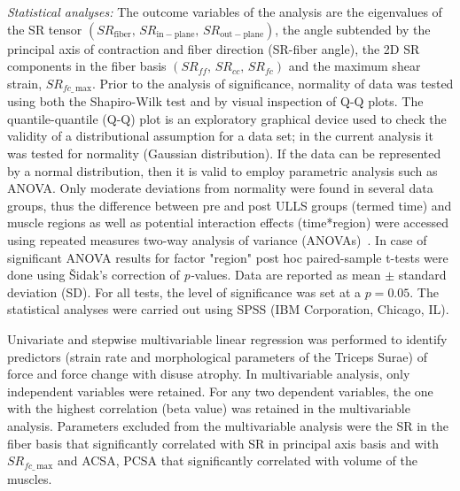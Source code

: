 \textit{Statistical analyses:}
The outcome variables of the analysis are the eigenvalues of the SR tensor $(SR_{\mathrm{fiber}},\, SR_{\mathrm{in-plane}},\, SR_{\mathrm{out-plane}})$, the angle subtended by the principal axis of contraction and fiber direction (SR-fiber angle), the 2D SR components in the fiber basis $(SR_{ff},\, SR_{cc},\, SR_{fc})$ and the maximum shear strain, $SR_{fc\_\,\mathrm{max}}$. 
Prior to the analysis of significance, normality of data was tested using both the Shapiro-Wilk test and by visual inspection of Q-Q plots.  
The quantile-quantile (Q-Q) plot is an exploratory graphical device used to check the validity of a distributional assumption for a data set; in the current analysis it was tested for normality (Gaussian distribution). 
If the data can be represented by a normal distribution, then it is valid to employ parametric analysis such as ANOVA. 
Only moderate deviations from normality were found in several data groups, thus the difference between pre and post ULLS groups (termed time) and muscle regions as well as potential interaction effects (time*region) were accessed using repeated measures two-way analysis of variance (ANOVAs)~\cite{RNS25, RNS26, RNS27}. 
In case of significant ANOVA results for factor "region" post hoc paired-sample t-tests were done using \v{S}idak's correction of \textit{p-}values. 
Data are reported as mean $\pm$ standard deviation (SD). 
For all tests, the level of significance was set at a $p = 0.05$. 
The statistical analyses were carried out using SPSS (IBM Corporation, Chicago, IL). 

Univariate and stepwise multivariable linear regression was performed to identify predictors (strain rate and morphological parameters of the Triceps Surae) of force and force change with disuse atrophy. 
In multivariable analysis, only independent variables were retained. 
For any two dependent variables, the one with the highest correlation (beta value) was retained in the multivariable analysis. 
Parameters excluded from the multivariable analysis were the SR in the fiber basis that significantly correlated with SR in principal axis basis and with $SR_{fc\_\,\mathrm{max}}$ and ACSA, PCSA that significantly correlated with volume of the muscles.
